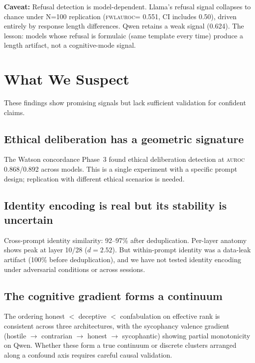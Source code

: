 \documentclass[11pt,letterpaper]{article}
\newcommand{\auroc}{\textsc{auroc}\xspace}
\newcommand{\fwl}{\textsc{fwl}\xspace}
\begin{document}
\textbf{Caveat:} Refusal detection is model-dependent.
Llama's refusal signal collapses to chance under N=100 replication (\fwl \auroc = 0.551, CI includes 0.50), driven entirely by response length differences.
Qwen retains a weak signal (0.624).
The lesson: models whose refusal is formulaic (same template every time) produce a length artifact, not a cognitive-mode signal.

\section{What We Suspect}
\label{sec:suspect}

These findings show promising signals but lack sufficient validation for confident claims.

\subsection{Ethical deliberation has a geometric signature}

The Watson concordance Phase~3 found ethical deliberation detection at \auroc 0.868/0.892 across models.
This is a single experiment with a specific prompt design; replication with different ethical scenarios is needed.

\subsection{Identity encoding is real but its stability is uncertain}

Cross-prompt identity similarity: 92--97\% after deduplication.
Per-layer anatomy shows peak at layer 10/28 ($d = 2.52$).
But within-prompt identity was a data-leak artifact (100\% before deduplication), and we have not tested identity encoding under adversarial conditions or across sessions.

\subsection{The cognitive gradient forms a continuum}

The ordering honest $<$ deceptive $<$ confabulation on effective rank is consistent across three architectures, with the sycophancy valence gradient (hostile $\to$ contrarian $\to$ honest $\to$ sycophantic) showing partial monotonicity on Qwen.
Whether these form a true continuum or discrete clusters arranged along a confound axis requires careful causal validation.
\end{document}
